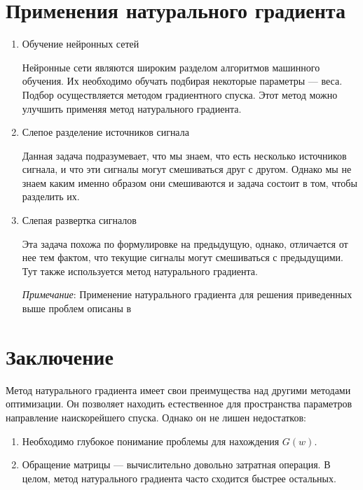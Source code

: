 \documentclass[a4paper,12pt]{article}
\begin{document}
\newpage

\section{Применения натурального градиента}
\begin{enumerate}
    \item Обучение нейронных сетей

        Нейронные сети являются широким разделом алгоритмов машинного обучения.
        Их необходимо обучать подбирая некоторые параметры --- веса. Подбор осуществляется методом градиентного спуска.
        Этот метод можно улучшить применяя метод натурального градиента.

    \item Слепое разделение источников сигнала

        Данная задача подразумевает, что мы знаем, что есть несколько источников сигнала, и что эти сигналы могут смешиваться
        друг с другом. Однако мы не знаем каким именно образом они смешиваются и задача состоит в том, чтобы разделить их.

    \item Слепая развертка сигналов

        Эта задача похожа по формулировке на предыдущую, однако, отличается от нее тем фактом, что текущие сигналы могут смешиваться
        с предыдущими. Тут также используется метод натурального градиента.

    \emph{Примечание}:
        Применение натурального градиента для решения приведенных выше проблем описаны в \cite{AmariWorks}
\end{enumerate}
\newpage
 
\section{Заключение}
Метод натурального градиента имеет свои преимущества над другими методами оптимизации. Он позволяет находить естественное для пространства параметров направление наискорейшего спуска. Однако он не лишен недостатков: 
\begin{enumerate}
    \item Необходимо глубокое понимание проблемы для нахождения $G(w)$. 
    \item Обращение матрицы --- вычислительно довольно затратная операция. В целом, метод натурального градиента часто сходится быстрее остальных.
\end{enumerate}
\newpage 
\end{document}
